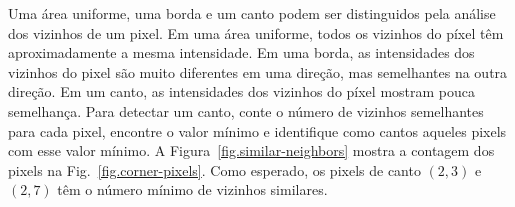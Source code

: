 
Uma área uniforme, uma borda e um canto podem ser distinguidos pela análise dos vizinhos de um pixel. Em uma área uniforme, todos os vizinhos do píxel têm aproximadamente a mesma intensidade. Em uma borda, as intensidades dos vizinhos do pixel são muito diferentes em uma direção, mas semelhantes na outra direção. Em um canto, as intensidades dos vizinhos do píxel mostram pouca semelhança. Para detectar um canto, conte o número de vizinhos semelhantes para cada pixel, encontre o valor mínimo e identifique como cantos aqueles pixels com esse valor mínimo. A Figura~\ref{fig.similar-neighbors} mostra a contagem dos pixels na Fig.~\ref{fig.corner-pixels}. Como esperado, os pixels de canto $(2,3)$ e $(2,7)$ têm o número mínimo de vizinhos similares.

